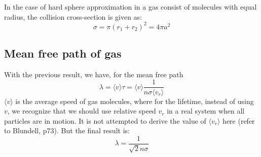 \documentclass{article}
\begin{document}
In the case of hard sphere approximation in a gas consist of molecules with
equal radius, the collision cross-section is given as:
\begin{equation}
    \sigma = \pi (r_1 + r_2) ^ 2 = 4 \pi a^2
\end{equation}

\subsection*{Mean free path of gas}
With the previous result, we have, for the mean free path
\begin{equation}
    \lambda = \langle v \rangle \tau = \langle v \rangle \frac{1}{n\sigma \langle v_r\rangle }
\end{equation}
$\langle v \rangle$ is the average speed of gas molecules,
where for the lifetime, instead of using $v$, we recognize that we should use 
relative speed $v_r$ in a real system when all particles are in motion. It is not attempted to derive
the value of $\langle v_r\rangle$ here (refer to Blundell, p73). But the final result
is: 
\begin{equation}
    \lambda = \frac{1}{\sqrt{2}n\sigma}
\end{equation}
\end{document}
